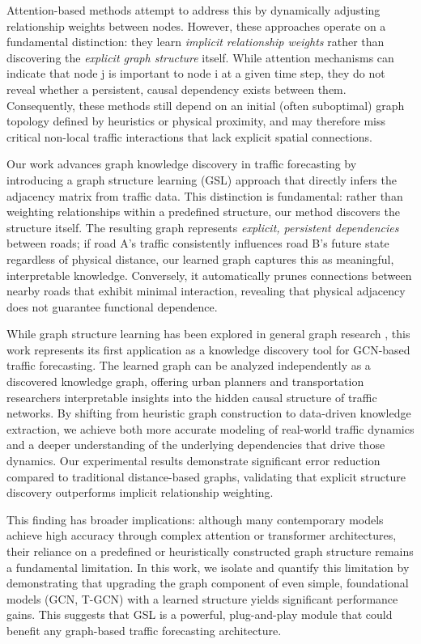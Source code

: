 \documentclass[pdflatex,sn-mathphys-num]{sn-jnl}%
\theoremstyle{thmstyleone}%
\theoremstyle{thmstyletwo}%
\theoremstyle{thmstylethree}%
\begin{document}
Attention-based methods \citep{A3T-GCN,Sun2023Attention,Chen2026TASTGCN} attempt to address this by dynamically adjusting relationship weights between nodes. However, these approaches operate on a fundamental distinction: they learn \textit{implicit relationship weights} rather than discovering the \textit{explicit graph structure} itself. While attention mechanisms can indicate that node j is important to node i at a given time step, they do not reveal whether a persistent, causal dependency exists between them. Consequently, these methods still depend on an initial (often suboptimal) graph topology defined by heuristics or physical proximity, and may therefore miss critical non-local traffic interactions that lack explicit spatial connections.

Our work advances graph knowledge discovery in traffic forecasting by introducing a graph structure learning (GSL) approach that directly infers the adjacency matrix from traffic data. This distinction is fundamental: rather than weighting relationships within a predefined structure, our method discovers the structure itself. The resulting graph represents \textit{explicit, persistent dependencies} between roads; if road A's traffic consistently influences road B's future state regardless of physical distance, our learned graph captures this as meaningful, interpretable knowledge. Conversely, it automatically prunes connections between nearby roads that exhibit minimal interaction, revealing that physical adjacency does not guarantee functional dependence.

While graph structure learning has been explored in general graph research \citep{Bello2024DAGMA}, this work represents its first application as a knowledge discovery tool for GCN-based traffic forecasting. The learned graph can be analyzed independently as a discovered knowledge graph, offering urban planners and transportation researchers interpretable insights into the hidden causal structure of traffic networks. By shifting from heuristic graph construction to data-driven knowledge extraction, we achieve both more accurate modeling of real-world traffic dynamics and a deeper understanding of the underlying dependencies that drive those dynamics. Our experimental results demonstrate significant error reduction compared to traditional distance-based graphs, validating that explicit structure discovery outperforms implicit relationship weighting.


This finding has broader implications: although many contemporary models achieve high accuracy through complex attention or transformer architectures, their reliance on a predefined or heuristically constructed graph structure remains a fundamental limitation. In this work, we isolate and quantify this limitation by demonstrating that upgrading the graph component of even simple, foundational models (GCN, T-GCN) with a learned structure yields significant performance gains. This suggests that GSL is a powerful, plug-and-play module that could benefit any graph-based traffic forecasting architecture.
\end{document}
